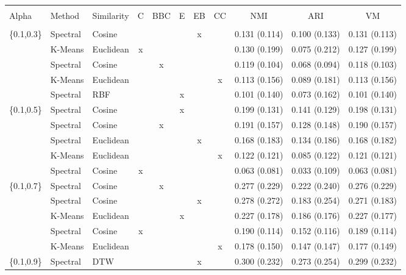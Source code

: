 \documentclass[12pt,a4paper,bibliography=totocnumbered,listof=totocnumbered]{scrartcl}
\begin{document}
{\begin{appendix}
\begin{table}[H] \centering 
	\label{} 
	\scriptsize
	\begin{tabularx}{\textwidth}{ lllcccccccc} \\
		\\[-1.8ex]	\toprule
		\\[-1.8ex] 
		Alpha & Method & Similarity & C & BBC & E & EB & CC & NMI & ARI & VM \\ 
		\hline \\[-1.8ex] 
	\{0.1,0.3\} & Spectral & Cosine &  &  &  & x &  & 0.131 (0.114) & 0.100 (0.133) & 0.131 (0.113) \\ 
	& K-Means & Euclidean & x &  &  &  &  & 0.130 (0.199) & 0.075 (0.212) & 0.127 (0.199) \\ 
	& Spectral & Cosine &  & x &  &  &  & 0.119 (0.104) & 0.068 (0.094) & 0.118 (0.103) \\ 
	& K-Means & Euclidean &  &  &  &  & x & 0.113 (0.156) & 0.089 (0.181) & 0.113 (0.156) \\ 
	& Spectral & RBF &  &  & x &  &  & 0.101 (0.140) & 0.073 (0.162) & 0.101 (0.140) \\ 
	\{0.1,0.5\} & Spectral & Cosine &  &  & x &  &  & 0.199 (0.131) & 0.141 (0.129) & 0.198 (0.131) \\ 
	& Spectral & Cosine &  & x &  &  &  & 0.191 (0.157) & 0.128 (0.148) & 0.190 (0.157) \\ 
	& Spectral & Euclidean &  &  &  & x &  & 0.168 (0.183) & 0.134 (0.186) & 0.168 (0.182) \\ 
	& K-Means & Euclidean &  &  &  &  & x & 0.122 (0.121) & 0.085 (0.122) & 0.121 (0.121) \\ 
	& Spectral & Cosine & x &  &  &  &  & 0.063 (0.081) & 0.033 (0.109) & 0.063 (0.081) \\ 
	\{0.1,0.7\} & Spectral & Cosine &  & x &  &  &  & 0.277 (0.229) & 0.222 (0.240) & 0.276 (0.229) \\ 
	& Spectral & Cosine &  &  &  & x &  & 0.278 (0.272) & 0.183 (0.254) & 0.271 (0.183) \\ 
	& K-Means & Euclidean &  &  & x &  &  & 0.227 (0.178) & 0.186 (0.176) & 0.227 (0.177) \\ 
	& Spectral & Cosine & x &  &  &  &  & 0.190 (0.114) & 0.152 (0.116) & 0.189 (0.114) \\ 
	& K-Means & Euclidean &  &  &  &  & x & 0.178 (0.150) & 0.147 (0.147) & 0.177 (0.149) \\ 
	\{0.1,0.9\} & Spectral & DTW &  &  &  & x &  & 0.300 (0.232) & 0.273 (0.254) & 0.299 (0.232) \\ 

\end{tabularx}
\end{table}
\end{appendix}}
\end{document}
